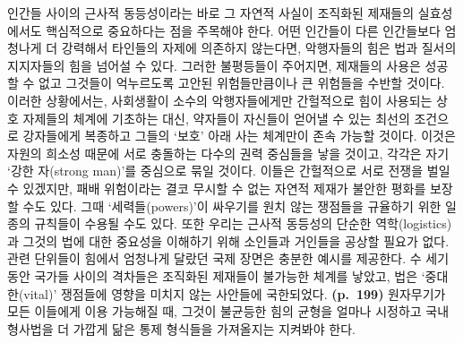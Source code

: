인간들 사이의 근사적 동등성이라는 바로 그 자연적 사실이 조직화된
제재들의 실효성에서도 핵심적으로 중요하다는 점을 주목해야 한다. 어떤
인간들이 다른 인간들보다 엄청나게 더 강력해서 타인들의 자제에 의존하지
않는다면, 악행자들의 힘은 법과 질서의 지지자들의 힘을 넘어설 수 있다.
그러한 불평등들이 주어지면, 제재들의 사용은 성공할 수 없고 그것들이
억누르도록 고안된 위험들만큼이나 큰 위험들을 수반할 것이다. 이러한
상황에서는, 사회생활이 소수의 악행자들에게만 간헐적으로 힘이 사용되는
상호 자제들의 체계에 기초하는 대신, 약자들이 자신들이 얻어낼 수 있는
최선의 조건으로 강자들에게 복종하고 그들의 ‘보호’ 아래 사는 체계만이
존속 가능할 것이다. 이것은 자원의 희소성 때문에 서로 충돌하는 다수의
권력 중심들을 낳을 것이고, 각각은 자기 ‘강한 자(strong man)’를 중심으로
묶일 것이다. 이들은 간헐적으로 서로 전쟁을 벌일 수 있겠지만, 패배
위험이라는 결코 무시할 수 없는 자연적 제재가 불안한 평화를 보장할 수도
있다. 그때 ‘세력들(powers)’이 싸우기를 원치 않는 쟁점들을 규율하기 위한
일종의 규칙들이 수용될 수도 있다. 또한 우리는 근사적 동등성의 단순한
역학(logistics)과 그것의 법에 대한 중요성을 이해하기 위해 소인들과
거인들을 공상할 필요가 없다. 관련 단위들이 힘에서 엄청나게 달랐던 국제
장면은 충분한 예시를 제공한다. 수 세기 동안 국가들 사이의 격차들은
조직화된 제재들이 불가능한 체계를 낳았고, 법은 ‘중대한(vital)’ 쟁점들에
영향을 미치지 않는 사안들에 국한되었다. \textbf{(p.~199)} 원자무기가
모든 이들에게 이용 가능해질 때, 그것이 불균등한 힘의 균형을 얼마나
시정하고 국내 형사법을 더 가깝게 닮은 통제 형식들을 가져올지는 지켜봐야
한다.


